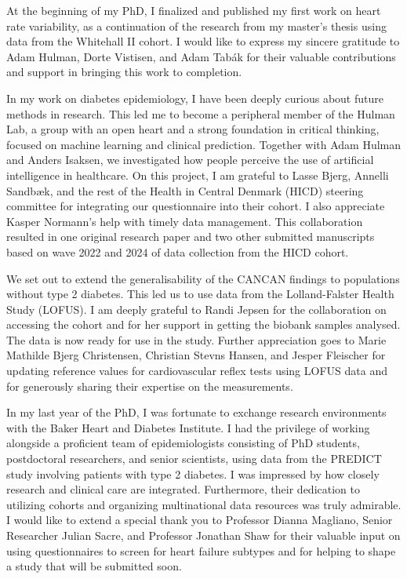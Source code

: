 \documentclass[
  a4paper,
  headsepline=true,
  open=left]{scrbook}
\begin{document}
At the beginning of my PhD, I finalized and published my first work on
heart rate variability, as a continuation of the research from my
master's thesis using data from the Whitehall II cohort. I would like to
express my sincere gratitude to Adam Hulman, Dorte Vistisen, and Adam
Tabák for their valuable contributions and support in bringing this work
to completion.

In my work on diabetes epidemiology, I have been deeply curious about
future methods in research. This led me to become a peripheral member of
the Hulman Lab, a group with an open heart and a strong foundation in
critical thinking, focused on machine learning and clinical prediction.
Together with Adam Hulman and Anders Isaksen, we investigated how people
perceive the use of artificial intelligence in healthcare. On this
project, I am grateful to Lasse Bjerg, Annelli Sandbæk, and the rest of
the Health in Central Denmark (HICD) steering committee for integrating
our questionnaire into their cohort. I also appreciate Kasper Normann's
help with timely data management. This collaboration resulted in one
original research paper and two other submitted manuscripts based on
wave 2022 and 2024 of data collection from the HICD cohort.

We set out to extend the generalisability of the CANCAN findings to
populations without type 2 diabetes. This led us to use data from the
Lolland-Falster Health Study (LOFUS). I am deeply grateful to Randi
Jepsen for the collaboration on accessing the cohort and for her support
in getting the biobank samples analysed. The data is now ready for use
in the study. Further appreciation goes to Marie Mathilde Bjerg
Christensen, Christian Stevns Hansen, and Jesper Fleischer for updating
reference values for cardiovascular reflex tests using LOFUS data and
for generously sharing their expertise on the measurements.

In my last year of the PhD, I was fortunate to exchange research
environments with the Baker Heart and Diabetes Institute. I had the
privilege of working alongside a proficient team of epidemiologists
consisting of PhD students, postdoctoral researchers, and senior
scientists, using data from the PREDICT study involving patients with
type 2 diabetes. I was impressed by how closely research and clinical
care are integrated. Furthermore, their dedication to utilizing cohorts
and organizing multinational data resources was truly admirable. I would
like to extend a special thank you to Professor Dianna Magliano, Senior
Researcher Julian Sacre, and Professor Jonathan Shaw for their valuable
input on using questionnaires to screen for heart failure subtypes and
for helping to shape a study that will be submitted soon.
\end{document}
